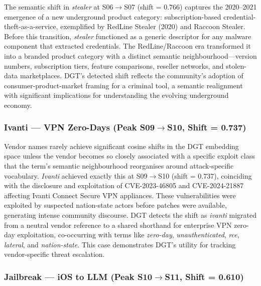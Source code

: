 \documentclass[12pt]{article}
\begin{document}
The semantic shift in \textit{stealer} at S06$\rightarrow$S07 (shift = 0.766) captures the 2020--2021 emergence of a new underground product category: subscription-based credential-theft-as-a-service, exemplified by RedLine Stealer (2020) and Raccoon Stealer. Before this transition, \textit{stealer} functioned as a generic descriptor for any malware component that extracted credentials. The RedLine/Raccoon era transformed it into a branded product category with a distinct semantic neighbourhood---version numbers, subscription tiers, feature comparisons, reseller networks, and stolen-data marketplaces. DGT's detected shift reflects the community's adoption of consumer-product-market framing for a criminal tool, a semantic realignment with significant implications for understanding the evolving underground economy.

\subsubsection{Ivanti --- VPN Zero-Days (Peak S09$\rightarrow$S10, Shift = 0.737)}

Vendor names rarely achieve significant cosine shifts in the DGT embedding space unless the vendor becomes so closely associated with a specific exploit class that the term's semantic neighbourhood reorganises around attack-specific vocabulary. \textit{Ivanti} achieved exactly this at S09$\rightarrow$S10 (shift = 0.737), coinciding with the disclosure and exploitation of CVE-2023-46805 and CVE-2024-21887 affecting Ivanti Connect Secure VPN appliances. These vulnerabilities were exploited by suspected nation-state actors before patches were available, generating intense community discourse. DGT detects the shift as \textit{ivanti} migrated from a neutral vendor reference to a shared shorthand for enterprise VPN zero-day exploitation, co-occurring with terms like \textit{zero-day}, \textit{unauthenticated}, \textit{rce}, \textit{lateral}, and \textit{nation-state}. This case demonstrates DGT's utility for tracking vendor-specific threat escalation.

\subsubsection{Jailbreak --- iOS to LLM (Peak S10$\rightarrow$S11, Shift = 0.610)}
\end{document}
